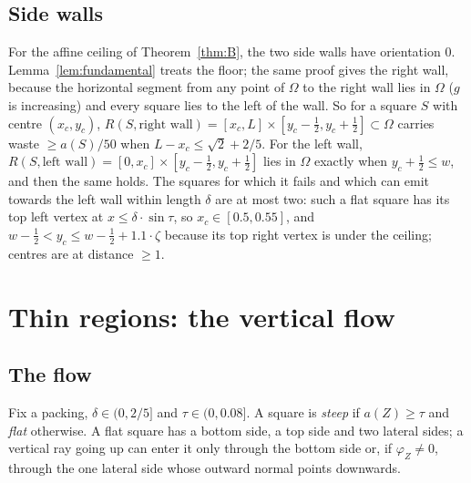 \documentclass[11pt,letterpaper]{amsart}
\theoremstyle{plain}
\theoremstyle{definition}
\theoremstyle{remark}
\begin{document}
\subsection*{Side walls}\label{sec:walls}
For the affine ceiling of Theorem~\ref{thm:B}, the two side walls have orientation $0$. Lemma~\ref{lem:fundamental} treats the floor; the same proof gives the right wall, because the horizontal segment from any point of $\Omega$ to the right wall lies in $\Omega$ ($g$ is increasing) and every square lies to the left of the wall. So for a square $S$ with centre $(x_c,y_c)$, $R(S,\text{right wall})=[x_c,L]\times[y_c-\tfrac12,y_c+\tfrac12]\subset\Omega$ carries waste $\ge a(S)/50$ when $L-x_c\le\sqrt2+2/5$. For the left wall, $R(S,\text{left wall})=[0,x_c]\times[y_c-\tfrac12,y_c+\tfrac12]$ lies in $\Omega$ exactly when $y_c+\tfrac12\le w$, and then the same holds. The squares for which it fails and which can emit towards the left wall within length $\delta$ are at most two: such a flat square has its top left vertex at $x\le\delta\cdot\sin\tau$, so $x_c\in[0.5,0.55]$, and $w-\tfrac12<y_c\le w-\tfrac12+1.1\cdot\zeta$ because its top right vertex is under the ceiling; centres are at distance $\ge1$.

\section{Thin regions: the vertical flow}\label{sec:vertical}
\subsection{The flow}
Fix a packing, $\delta\in(0,2/5]$ and $\tau\in(0,0.08]$. A square is \emph{steep} if $a(Z)\ge\tau$ and \emph{flat} otherwise. A flat square has a bottom side, a top side and two lateral sides; a vertical ray going up can enter it only through the bottom side or, if $\varphi_Z\ne0$, through the one lateral side whose outward normal points downwards.
\end{document}
